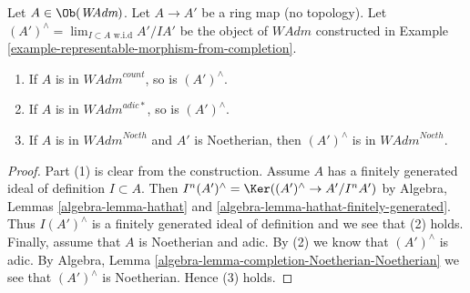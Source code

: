 \begin{lemma}
\label{lemma-completion-in-sub}
Let $A \in \Ob(\textit{WAdm})$. Let $A \to A'$ be a ring
map (no topology). Let $(A')^\wedge = \lim_{I \subset A\text{ w.i.d}} A'/IA'$
be the object of $\textit{WAdm}$ constructed in
Example \ref{example-representable-morphism-from-completion}.
\begin{enumerate}
\item If $A$ is in $\textit{WAdm}^{count}$, so is $(A')^\wedge$.
\item If $A$ is in $\textit{WAdm}^{adic*}$, so is $(A')^\wedge$.
\item If $A$ is in $\textit{WAdm}^{Noeth}$ and $A'$ is Noetherian, then
$(A')^\wedge$ is in $\textit{WAdm}^{Noeth}$.
\end{enumerate}
\end{lemma}

\begin{proof}
Part (1) is clear from the construction.
Assume $A$ has a finitely generated ideal of definition $I \subset A$.
Then $I^n(A')^\wedge =  \Ker((A')^\wedge \to A'/I^nA')$ by Algebra, Lemmas
\ref{algebra-lemma-hathat} and
\ref{algebra-lemma-hathat-finitely-generated}.
Thus $I(A')^\wedge$ is a finitely generated ideal of definition
and we see that (2) holds.
Finally, assume that $A$ is Noetherian and adic.
By (2) we know that $(A')^\wedge$ is adic.
By Algebra, Lemma \ref{algebra-lemma-completion-Noetherian-Noetherian}
we see that $(A')^\wedge$ is Noetherian. Hence (3) holds.
\end{proof}

